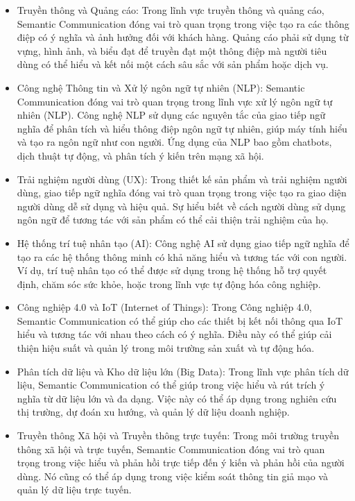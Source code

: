 \documentclass{article} %
\begin{document}
\begin{itemize}
\item Truyền thông và Quảng cáo: Trong lĩnh vực truyền thông và quảng cáo, Semantic Communication đóng vai trò quan trọng trong việc tạo ra các thông điệp có ý nghĩa và ảnh hưởng đối với khách hàng. Quảng cáo phải sử dụng từ vựng, hình ảnh, và biểu đạt để truyền đạt một thông điệp mà người tiêu dùng có thể hiểu và kết nối một cách sâu sắc với sản phẩm hoặc dịch vụ.
\item Công nghệ Thông tin và Xử lý ngôn ngữ tự nhiên (NLP): Semantic Communication đóng vai trò quan trọng trong lĩnh vực xử lý ngôn ngữ tự nhiên (NLP). Công nghệ NLP sử dụng các nguyên tắc của giao tiếp ngữ nghĩa để phân tích và hiểu thông điệp ngôn ngữ tự nhiên, giúp máy tính hiểu và tạo ra ngôn ngữ như con người. Ứng dụng của NLP bao gồm chatbots, dịch thuật tự động, và phân tích ý kiến trên mạng xã hội.
\item Trải nghiệm người dùng (UX): Trong thiết kế sản phẩm và trải nghiệm người dùng, giao tiếp ngữ nghĩa đóng vai trò quan trọng trong việc tạo ra giao diện người dùng dễ sử dụng và hiệu quả. Sự hiểu biết về cách người dùng sử dụng ngôn ngữ để tương tác với sản phẩm có thể cải thiện trải nghiệm của họ.
\item Hệ thống trí tuệ nhân tạo (AI): Công nghệ AI sử dụng giao tiếp ngữ nghĩa để tạo ra các hệ thống thông minh có khả năng hiểu và tương tác với con người. Ví dụ, trí tuệ nhân tạo có thể được sử dụng trong hệ thống hỗ trợ quyết định, chăm sóc sức khỏe, hoặc trong lĩnh vực tự động hóa công nghiệp.
\item Công nghiệp 4.0 và IoT (Internet of Things): Trong Công nghiệp 4.0, Semantic Communication có thể giúp cho các thiết bị kết nối thông qua IoT hiểu và tương tác với nhau theo cách có ý nghĩa. Điều này có thể giúp cải thiện hiệu suất và quản lý trong môi trường sản xuất và tự động hóa.
\item Phân tích dữ liệu và Kho dữ liệu lớn (Big Data): Trong lĩnh vực phân tích dữ liệu, Semantic Communication có thể giúp trong việc hiểu và rút trích ý nghĩa từ dữ liệu lớn và đa dạng. Việc này có thể áp dụng trong nghiên cứu thị trường, dự đoán xu hướng, và quản lý dữ liệu doanh nghiệp.
\item Truyền thông Xã hội và Truyền thông trực tuyến: Trong môi trường truyền thông xã hội và trực tuyến, Semantic Communication đóng vai trò quan trọng trong việc hiểu và phản hồi trực tiếp đến ý kiến và phản hồi của người dùng. Nó cũng có thể áp dụng trong việc kiểm soát thông tin giả mạo và quản lý dữ liệu trực tuyến.

\end{itemize}
\end{document}
